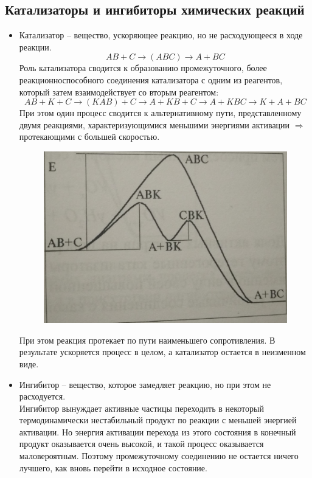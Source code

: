 \documentclass[14pt,a4paper]{scrartcl}
\begin{document}
\subsection*{Катализаторы и ингибиторы химических реакций}
\begin{itemize}
	\item Катализатор -- вещество, ускоряющее реакцию, но не расходующееся в ходе реакции.
	$$ AB + C \rightarrow (ABC) \rightarrow A + BC $$
	Роль катализатора сводится к образованию промежуточного, более реакционноспособного соединения катализатора с одним из реагентов, который затем взаимодействует со вторым реагентом:
	$$ AB + K + C \rightarrow (KAB) + C \rightarrow A + KB + C \rightarrow A + KBC \rightarrow K + A + BC $$
	При этом один процесс сводится к альтернативному пути, представленному двумя реакциями, характеризующимися меньшими энергиями активации $\Rightarrow$ протекающими с большей скоростью.
	\begin{figure}[H]
		\centering
		\includegraphics[scale=0.5]{Kat}
		\label{}
	\end{figure}
	При этом реакция протекает по пути наименьшего сопротивления. В результате ускоряется процесс в целом, а катализатор остается в неизменном виде.
	\item Ингибитор -- вещество, которое замедляет реакцию, но при этом не расходуется. \\
	Ингибитор вынуждает активные частицы переходить в некоторый термодинамически нестабильный продукт по реакции с меньшей энергией активации. Но энергия активации перехода из этого состояния в конечный продукт оказывается очень высокой, и такой процесс оказывается маловероятным. Поэтому промежуточному соединению не остается ничего лучшего, как вновь перейти в исходное состояние.
\end{itemize}
\end{document}
